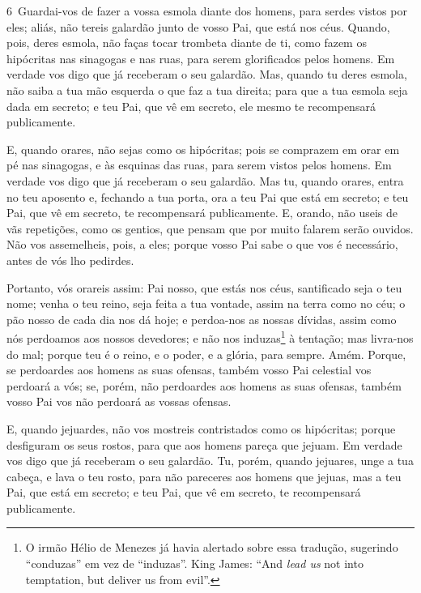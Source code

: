 \medskip

\lettrine{6}\ Guardai-vos de fazer a vossa esmola diante dos
homens, para serdes vistos por eles; aliás, não tereis galardão
junto de vosso Pai, que está nos céus. Quando, pois, deres
esmola, não faças tocar trombeta diante de ti, como fazem os
hipócritas nas sinagogas e nas ruas, para serem glorificados pelos
homens. Em verdade vos digo que já receberam o seu galardão.
Mas, quando tu deres esmola, não saiba a tua mão esquerda o que
faz a tua direita; para que a tua esmola seja dada em secreto; e
teu Pai, que vê em secreto, ele mesmo te recompensará publicamente.

E, quando orares, não sejas como os hipócritas; pois se comprazem
em orar em pé nas sinagogas, e às esquinas das ruas, para serem
vistos pelos homens. Em verdade vos digo que já receberam o seu
galardão. Mas tu, quando orares, entra no teu aposento e,
fechando a tua porta, ora a teu Pai que está em secreto; e teu Pai,
que vê em secreto, te recompensará publicamente. E, orando, não
useis de vãs repetições, como os gentios, que pensam que por muito
falarem serão ouvidos. Não vos assemelheis, pois, a eles; porque
vosso Pai sabe o que vos é necessário, antes de vós lho pedirdes.

Portanto, vós orareis assim: Pai nosso, que estás nos céus,
santificado seja o teu nome; venha o teu reino, seja feita a
tua vontade, assim na terra como no céu; o pão nosso de cada
dia nos dá hoje; e perdoa-nos as nossas dívidas, assim como
nós perdoamos aos nossos devedores; e não nos
induzas\footnote{O irmão Hélio de Menezes já havia alertado sobre
essa tradução, sugerindo ``conduzas'' em vez de ``induzas''. King
James: ``And \emph{lead us} not into temptation, but deliver us from
evil''.} à tentação; mas livra-nos do mal; porque teu é o reino, e o
poder, e a glória, para sempre. Amém. Porque, se perdoardes
aos homens as suas ofensas, também vosso Pai celestial vos perdoará
a vós; se, porém, não perdoardes aos homens as suas ofensas,
também vosso Pai vos não perdoará as vossas ofensas.

E, quando jejuardes, não vos mostreis contristados como os
hipócritas; porque desfiguram os seus rostos, para que aos homens
pareça que jejuam. Em verdade vos digo que já receberam o seu
galardão. Tu, porém, quando jejuares, unge a tua cabeça, e
lava o teu rosto, para não pareceres aos homens que jejuas,
mas a teu Pai, que está em secreto; e teu Pai, que vê em secreto, te
recompensará publicamente.

